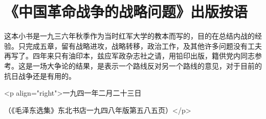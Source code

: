 \section[《中国革命战争的战略问题》出版按语（一九四一年二月二十三日）]{《中国革命战争的战略问题》出版按语}


这本小书是一九三六年秋季作为当时红军大学的教本而写的，目的在总结内战的经验。只完成五章，留有战略进攻，战略转移，政治工作，及其他许多问题没有工夫再写了。四年来只有油印本，兹应军政杂志社之请，用铅印出版，籍供党内同志参考。这是一场大争论的结果，是表示一个路线反对另一个路线的意见，对于目前的抗日战争还是有用的。

<p align="right">一九四一年二月二十三日

（《毛泽东选集》东北书店一九四八年版第五八五页）</p>

